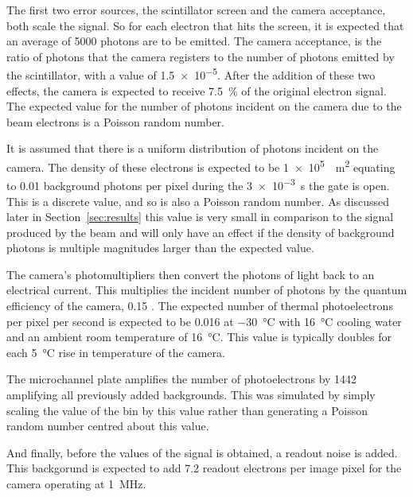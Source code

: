 
The first two error sources, the scintillator screen and the camera acceptance,
both scale the signal. So for each electron that hits the screen, it is
expected that an average of \num{5000} \cite{} photons are to be emitted. The
camera acceptance, is the ratio of photons that the camera registers to the
number of photons emitted by the scintillator, with a value of \num{1.5e-5}.
After the addition of these two effects, the camera is expected to receive
\SI{7.5}{\percent} of the original electron signal. The expected value for the
number of photons incident on the camera due to the beam electrons is a Poisson
random number.

It is assumed that there is a uniform distribution of photons incident on the
camera. The density of these electrons is expected to be
\SI{1e5}{\per\meter\squared} equating to \num{0.01} background photons per
pixel during the \SI{3e-3}{\second} the gate is open. This is a discrete
value, and so is also a Poisson random number. As discussed later in
Section~\ref{sec:results} this value is very small in comparison to the signal
produced by the beam and will only have an effect if the density of background
photons is multiple magnitudes larger than the expected value.

The camera's photomultipliers then convert the photons of light back to an
electrical current. This multiplies the incident number of photons by the
quantum efficiency of the camera, \num{0.15} \cite{}. The expected number of
thermal photoelectrons per pixel per second is expected to be \num{0.016} at
\SI{-30}{\celsius} with \SI{16}{\celsius} cooling water and an ambient room
temperature of \SI{16}{\celsius}. This value is typically doubles for each
\SI{5}{\celsius} rise in temperature of the camera.

The microchannel plate amplifies the number of photoelectrons by \num{1442}
amplifying all previously added backgrounds.
This was simulated by simply scaling the value of the bin by this value rather
than generating a Poisson random number centred about this value.

And finally, before the values of the signal is obtained, a readout noise is
added. This backgorund is expected to add \num{7.2} readout electrons per image
pixel for the camera operating at \SI{1}{\mega\hertz}.

